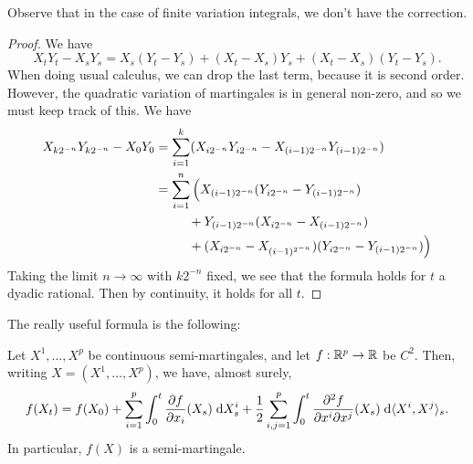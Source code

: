\documentclass[a4paper]{article}
\begin{document}
Observe that in the case of finite variation integrals, we don't have the correction.
\begin{proof}
  We have
  \[
    X_t Y_t - X_s Y_s = X_s (Y_t - Y_s) + (X_t - X_s) Y_s + (X_t - X_s)(Y_t - Y_s).
  \]
  When doing usual calculus, we can drop the last term, because it is second order. However, the quadratic variation of martingales is in general non-zero, and so we must keep track of this. We have
  \begin{align*}
    X_{k2^{-n}} Y_{k2^{-n}} - X_0 Y_0 &= \sum_{i = 1}^k (X_{i2^{-n}} Y_{i2^{-n}} - X_{(i - 1)2^{-n}}Y_{(i - 1)2^{-n}})\\
  &= \sum_{i = 1}^n \Big( X_{(i - 1)2^{-n}} (Y_{i2^{-n}} - Y_{(i - 1)2^{-n}})\\
  &\hphantom{=aaa}+ Y_{(i - 1)2^{-n}}(X_{i 2^{-n}} - X_{(i - 1)2^{-n}}) \\
  &\hphantom{=aaa} + (X_{i2^{-n}} - X_{(i - 1)^{2^{-n}}})(Y_{i2^{-n}} - Y_{(i - 1)2^{-n}})\Big)
  \end{align*}
  Taking the limit $n \to \infty$ with $k2^{-n}$ fixed, we see that the formula holds for $t$ a dyadic rational. Then by continuity, it holds for all $t$.
\end{proof}

The really useful formula is the following:
\begin{thm}[It\^o's formula]
  Let $X^1, \ldots, X^p$ be continuous semi-martingales, and let $f: \mathbb{R}^p \to \mathbb{R}$ be $C^2$. Then, writing $X = (X^1, \ldots, X^p)$, we have, almost surely,
  \[
    f(X_t) = f(X_0) + \sum_{i = 1}^p \int_0^t \frac{\partial f}{\partial x_i}(X_s)\;\mathrm{d} X_s^i + \frac{1}{2} \sum_{i, j = 1}^p \int_0^t \frac{\partial^2 f}{\partial x^i \partial x^j} (X_s) \;\mathrm{d} \langle X^i, X^j\rangle_s.
  \]
  In particular, $f(X)$ is a semi-martingale.
\end{thm}
\end{document}
